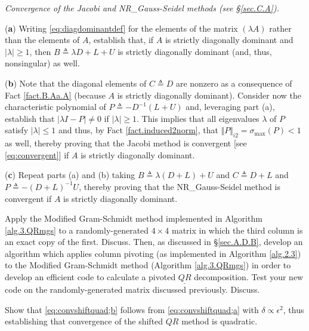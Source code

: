 \begin{exercise} \label{ex.4.Jacobi.NR_Gauss-Seidel} \rm {\it Convergence of the Jacobi and NR_Gauss-Seidel methods (see \S \ref{sec.C.A}).}\vskip0.05in

\noindent ({\bf a}) Writing \eqref{eq:diagdominantdef} for the elements of the matrix $(\lambda A)$ rather than the elements of $A$,
establish that, if $A$ is strictly diagonally dominant and
$|\lambda|\ge 1$, then $B\triangleq \lambda D+L+U$ is strictly diagonally dominant (and, thus, nonsingular) as well.\vskip0.1in

\noindent ({\bf b}) Note that the diagonal elements of $C\triangleq D$ are nonzero as a consequence of Fact \ref{fact.B.Aa.A} (because $A$ is strictly diagonally dominant).
Consider now the characteristic polynomial of $P\triangleq -D^{-1}(L+U)$ and, leveraging part (a), establish that $|\lambda I - P|\ne 0$ if $|\lambda|\ge 1$.  This implies that all eigenvalues
$\lambda$ of $P$ satisfy $|\lambda|\le 1$ and thus, by Fact \ref{fact.induced2norm}, that $\Vert P\Vert_{i2} = \sigma_{\textrm{max}}(P)<1$ as well,
thereby proving that the Jacobi method is convergent [see \eqref{eq:convergent}] if $A$ is strictly diagonally dominant.\vskip0.1in

\noindent ({\bf c}) Repeat parts (a) and (b) taking $B\triangleq \lambda (D+L)+U$ and $C\triangleq D+L$ and $P\triangleq -(D+L)^{-1} U$,
thereby proving that the NR_Gauss-Seidel method is convergent if $A$ is strictly diagonally dominant.
\end{exercise}

\begin{exercise} \label{ex:04.QRmgspivot} \rm Apply the Modified Gram-Schmidt method implemented in Algorithm \ref{alg.3.QRmgs} to a randomly-generated $4\times 4$ matrix in which the third column is an exact copy of the first.  Discuss.
Then, as discussed in \S \ref{sec.A.D.B}, develop an algorithm which applies column pivoting (as implemented in Algorithm \ref{alg.2.3}) to the Modified Gram-Schmidt method (Algorithm \ref{alg.3.QRmgs})
in order to develop an efficient code to calculate a pivoted $\underline{QR}$ decomposition.  Test your new code on the randomly-generated matrix discussed previously.  Discuss.
\end{exercise}

\begin{exercise} \label{ex:04.convshiftquad} \rm Show that \eqref{eq:convshiftquad;b} follows from \eqref{eq:convshiftquad;a} with $\delta \propto \epsilon^2$,
thus establishing that convergence of the shifted $QR$ method is quadratic.
\end{exercise}

